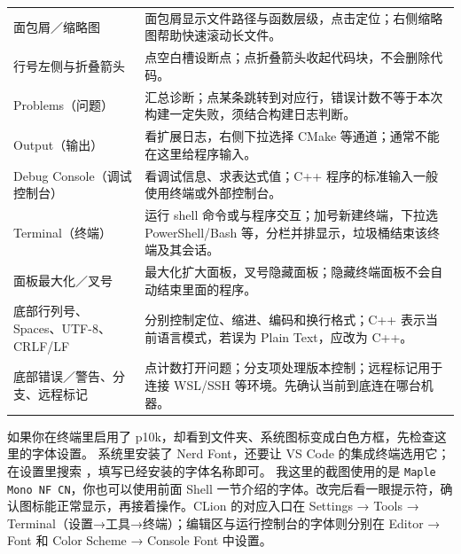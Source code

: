 \begin{longtable}{p{}p{}}
面包屑／缩略图 & 面包屑显示文件路径与函数层级，点击定位；右侧缩略图帮助快速滚动长文件。\\
行号左侧与折叠箭头 & 点空白槽设断点；点折叠箭头收起代码块，不会删除代码。\\
Problems（问题） & 汇总诊断；点某条跳转到对应行，错误计数不等于本次构建一定失败，须结合构建日志判断。\\
Output（输出） & 看扩展日志，右侧下拉选择 CMake 等通道；通常不能在这里给程序输入。\\
Debug Console（调试控制台） & 看调试信息、求表达式值；C++ 程序的标准输入一般使用终端或外部控制台。\\
Terminal（终端） & 运行 shell 命令或与程序交互；加号新建终端，下拉选 PowerShell/Bash 等，分栏并排显示，垃圾桶结束该终端及其会话。\\
面板最大化／叉号 & 最大化扩大面板，叉号隐藏面板；隐藏终端面板不会自动结束里面的程序。\\
底部行列号、Spaces、UTF-8、CRLF/LF & 分别控制定位、缩进、编码和换行格式；C++ 表示当前语言模式，若误为 Plain Text，应改为 C++。\\
底部错误／警告、分支、远程标记 & 点计数打开问题；分支项处理版本控制；远程标记用于连接 WSL/SSH 等环境。先确认当前到底连在哪台机器。\\
\bottomrule[1.5pt]
\end{longtable}\endgroup

如果你在终端里启用了 p10k，却看到文件夹、系统图标变成白色方框，先检查这里的字体设置。
系统里安装了 Nerd Font，还要让 VS Code 的集成终端选用它；在设置里搜索 ，填写已经安装的字体名称即可。
我这里的截图使用的是 \texttt{Maple Mono NF CN}，你也可以使用前面 Shell 一节介绍的字体。改完后看一眼提示符，确认图标能正常显示，再接着操作。CLion 的对应入口在 Settings → Tools → Terminal（设置→工具→终端）；编辑区与运行控制台的字体则分别在 Editor → Font 和 Color Scheme → Console Font 中设置。

